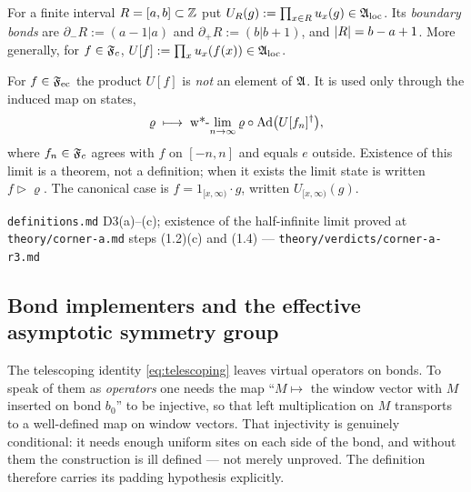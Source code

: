 \begin{definition}
\label{def:truncated-symmetry}
For a finite interval $R = [a,b] \subset \mathbb{Z}$ put
$U_{R}(g) := \prod_{x \in R} u_{x}(g) \in \mathfrak{A}_{\mathrm{loc}}$. Its \emph{boundary bonds}
are $\partial_{-}R := (a-1|a)$ and $\partial_{+}R := (b|b+1)$, and
$\lvert R\rvert = b-a+1$. More generally, for $f \in \mathfrak{F}_{c}$,
$U[f] := \prod_{x} u_{x}(f(x)) \in \mathfrak{A}_{\mathrm{loc}}$.
\end{definition}

\begin{definition}
\label{def:half-infinite-string}
For $f \in \mathfrak{F}_{\mathrm{ec}}$ the product $U[f]$ is \emph{not} an element of $\mathfrak{A}$. It is
used only through the induced map on states,
\begin{equation}
  \varrho \;\longmapsto\;
  \text{w*-}\!\lim_{n \to \infty} \varrho \circ \operatorname{Ad}\bigl(U[f_{n}]^{\dagger}\bigr),
\end{equation}
where $f_{n} \in \mathfrak{F}_{c}$ agrees with $f$ on $[-n,n]$ and equals $e$ outside.
Existence of this limit is a theorem, not a definition; when it exists the
limit state is written $f \triangleright \varrho$. The canonical case is
$f = 1_{[x,\infty)} \cdot g$, written $U_{[x,\infty)}(g)$.
\end{definition}

%
{\texttt{definitions.md} D3(a)--(c); existence of the half-infinite limit
 proved at \texttt{theory/corner-a.md} steps (1.2)(c) and (1.4)}%
{---}%
{\texttt{theory/verdicts/corner-a-r3.md}}

\subsection{Bond implementers and the effective asymptotic symmetry group}

The telescoping identity \eqref{eq:telescoping} leaves virtual operators on
bonds. To speak of them as \emph{operators} one needs the map
``$M \mapsto$ the window vector with $M$ inserted on bond $b_{0}$'' to be
injective, so that left multiplication on $M$ transports to a well-defined map
on window vectors. That injectivity is genuinely conditional: it needs enough
uniform sites on each side of the bond, and without them the construction is
ill defined --- not merely unproved. The definition therefore carries its
padding hypothesis explicitly.

